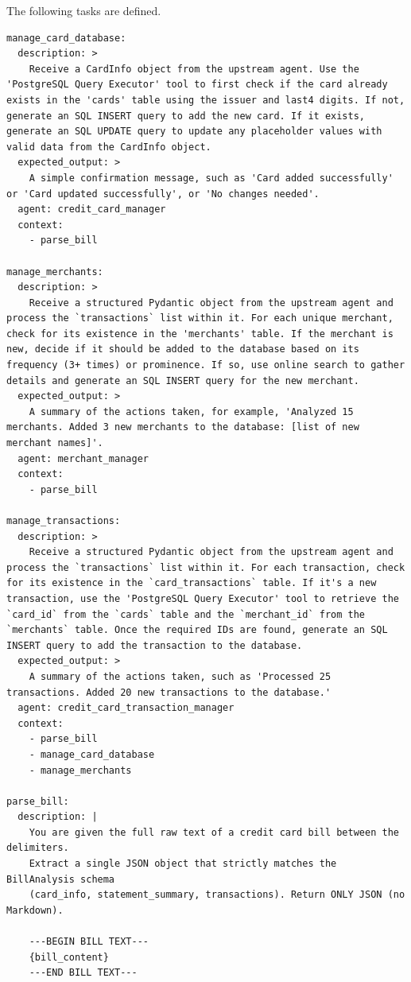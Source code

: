The following tasks are defined.

\begin{lstlisting}
manage_card_database:
  description: >
    Receive a CardInfo object from the upstream agent. Use the 'PostgreSQL Query Executor' tool to first check if the card already exists in the 'cards' table using the issuer and last4 digits. If not, generate an SQL INSERT query to add the new card. If it exists, generate an SQL UPDATE query to update any placeholder values with valid data from the CardInfo object.
  expected_output: >
    A simple confirmation message, such as 'Card added successfully' or 'Card updated successfully', or 'No changes needed'.
  agent: credit_card_manager
  context:
    - parse_bill

manage_merchants:
  description: >
    Receive a structured Pydantic object from the upstream agent and process the `transactions` list within it. For each unique merchant, check for its existence in the 'merchants' table. If the merchant is new, decide if it should be added to the database based on its frequency (3+ times) or prominence. If so, use online search to gather details and generate an SQL INSERT query for the new merchant.
  expected_output: >
    A summary of the actions taken, for example, 'Analyzed 15 merchants. Added 3 new merchants to the database: [list of new merchant names]'.
  agent: merchant_manager
  context:
    - parse_bill

manage_transactions:
  description: >
    Receive a structured Pydantic object from the upstream agent and process the `transactions` list within it. For each transaction, check for its existence in the `card_transactions` table. If it's a new transaction, use the 'PostgreSQL Query Executor' tool to retrieve the `card_id` from the `cards` table and the `merchant_id` from the `merchants` table. Once the required IDs are found, generate an SQL INSERT query to add the transaction to the database.
  expected_output: >
    A summary of the actions taken, such as 'Processed 25 transactions. Added 20 new transactions to the database.'
  agent: credit_card_transaction_manager
  context:
    - parse_bill
    - manage_card_database
    - manage_merchants

parse_bill:
  description: |
    You are given the full raw text of a credit card bill between the delimiters.
    Extract a single JSON object that strictly matches the BillAnalysis schema
    (card_info, statement_summary, transactions). Return ONLY JSON (no Markdown).

    ---BEGIN BILL TEXT---
    {bill_content}
    ---END BILL TEXT---


\end{lstlisting}
